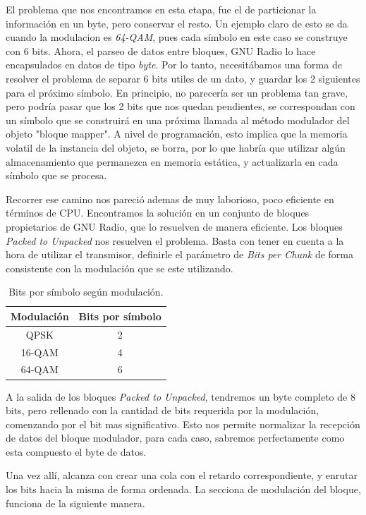 El problema que nos encontramos en esta etapa, fue el de particionar la información en un byte, pero conservar el resto. Un ejemplo claro de esto se da cuando la modulacion es \textit{64-QAM}, pues cada símbolo en este caso se construye con 6 bits. Ahora, el parseo de datos entre bloques, GNU Radio lo hace encapsulados en datos de tipo \textit{byte}. Por lo tanto, necesitábamos una forma de resolver el problema de separar 6 bits utiles de un dato, y guardar los 2 siguientes para el próximo símbolo. En principio, no parecería ser un problema tan grave, pero podría pasar que los 2 bits que nos quedan pendientes, se correspondan con un símbolo que se construirá en una próxima llamada al método modulador del objeto "bloque mapper". A nivel de programación, esto implica que la memoria volatil de la instancia del objeto, se borra, por lo que habría que utilizar algún almacenamiento que permanezca en memoria estática, y actualizarla en cada símbolo que se procesa.

Recorrer ese camino nos pareció ademas de muy laborioso, poco eficiente en términos de CPU. Encontramos la solución en un conjunto de bloques propietarios de GNU Radio, que lo resuelven de manera eficiente. Los bloques \textit{Packed to Unpacked} nos resuelven el problema. Basta con tener en cuenta a la hora de utilizar el transmisor, definirle el parámetro de \textit{Bits per Chunk} de forma consistente con la modulación que se este utilizando. 

\begin{table}[h!]
	\centering
	\begin{tabular}{|c|c|}
		\hline
		\textbf{Modulación} & \textbf{Bits por símbolo}\\
		\hline
		QPSK		& 2\\
		\hline
		16-QAM 		& 4\\
		\hline
		64-QAM		& 6\\
		\hline
	\end{tabular}
	\caption{\label{Bits por simbolo segun modulacion} Bits por símbolo según modulación.}
\end{table}

A la salida de los bloques \textit{Packed to Unpacked}, tendremos un byte completo de 8 bits, pero rellenado con la cantidad de bits requerida por la modulación, comenzando por el bit mas significativo.  Esto nos permite normalizar la recepción de datos del bloque modulador, para cada caso, sabremos perfectamente como esta compuesto el byte de datos. 

Una vez allí, alcanza con crear una cola con el retardo correspondiente, y enrutar los bits hacia la misma de forma ordenada. La secciona de modulación del bloque, funciona de la siguiente manera. 


